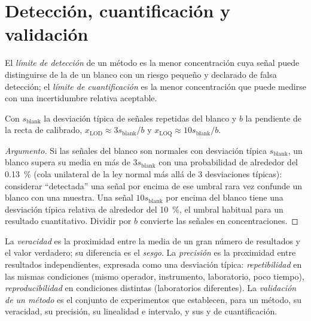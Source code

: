 \section{Detección, cuantificación y validación}

\begin{definition}[Límites]\label{def:b2:measurement-statistics:limits}
El \emph{límite de detección} de un método es la menor concentración cuya
señal puede distinguirse de la de un blanco con un riesgo pequeño y declarado de falsa detección; el
\emph{límite de cuantificación} es la menor concentración que puede
medirse con una incertidumbre relativa aceptable.
\end{definition}

\begin{proposition}\label{prop:b2:measurement-statistics:lod}
Con $s_{\mathrm{blank}}$ la desviación típica de señales repetidas del blanco y $b$ la pendiente de la
recta de calibrado, $x_{\mathrm{LOD}} \approx 3s_{\mathrm{blank}}/b$ y $x_{\mathrm{LOQ}} \approx
10s_{\mathrm{blank}}/b$.
\end{proposition}

\begin{proof}[Argumento]
Si las señales del blanco son normales con desviación típica $s_{\mathrm{blank}}$, un blanco supera su media en
más de $3s_{\mathrm{blank}}$ con una probabilidad de alrededor del 0.13~\% (cola unilateral de la ley normal más allá de
3 desviaciones típicas): considerar ``detectada'' una señal por encima de ese umbral rara vez confunde un blanco con
una muestra. Una señal $10s_{\mathrm{blank}}$ por encima del blanco tiene una desviación típica relativa de alrededor del
10~\%, el umbral habitual para un resultado cuantitativo. Dividir por $b$ convierte las señales en
concentraciones.
\end{proof}

\begin{definition}[Validación]\label{def:b2:measurement-statistics:validation}
La \emph{veracidad} es la proximidad entre la media de un gran número de resultados y el valor
verdadero; su diferencia es el \emph{sesgo}. La \emph{precisión} es la
proximidad entre resultados independientes, expresada como una desviación típica:
\emph{repetibilidad} en las mismas condiciones (mismo operador, instrumento,
laboratorio, poco tiempo), \emph{reproducibilidad} en condiciones distintas
(laboratorios diferentes). La \emph{validación de un método} es el conjunto de experimentos
que establecen, para un método, su veracidad, su precisión, su linealidad e intervalo, y sus 
y de cuantificación.
\end{definition}

